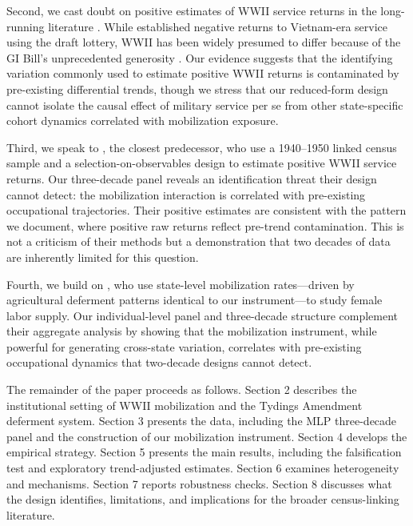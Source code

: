 \documentclass[12pt]{article}
\begin{document}
Second, we cast doubt on positive estimates of WWII service returns in the long-running literature \citep{angrist1990, angrist1998, angristkrueger1994, xie1992, costa2023}. While \citet{angrist1990} established negative returns to Vietnam-era service using the draft lottery, WWII has been widely presumed to differ because of the GI Bill's unprecedented generosity \citep{boundturner2002, turnerbound2003, mettler2005, fetter2013}. Our evidence suggests that the identifying variation commonly used to estimate positive WWII returns is contaminated by pre-existing differential trends, though we stress that our reduced-form design cannot isolate the causal effect of military service per se from other state-specific cohort dynamics correlated with mobilization exposure.

Third, we speak to \citet{collinszimran2025}, the closest predecessor, who use a 1940--1950 linked census sample and a selection-on-observables design to estimate positive WWII service returns. Our three-decade panel reveals an identification threat their design cannot detect: the mobilization interaction is correlated with pre-existing occupational trajectories. Their positive estimates are consistent with the pattern we document, where positive raw returns reflect pre-trend contamination. This is not a criticism of their methods but a demonstration that two decades of data are inherently limited for this question.

Fourth, we build on \citet{acemoglu2004}, who use state-level mobilization rates---driven by agricultural deferment patterns identical to our instrument---to study female labor supply. Our individual-level panel and three-decade structure complement their aggregate analysis by showing that the mobilization instrument, while powerful for generating cross-state variation, correlates with pre-existing occupational dynamics that two-decade designs cannot detect.

The remainder of the paper proceeds as follows. Section 2 describes the institutional setting of WWII mobilization and the Tydings Amendment deferment system. Section 3 presents the data, including the MLP three-decade panel and the construction of our mobilization instrument. Section 4 develops the empirical strategy. Section 5 presents the main results, including the falsification test and exploratory trend-adjusted estimates. Section 6 examines heterogeneity and mechanisms. Section 7 reports robustness checks. Section 8 discusses what the design identifies, limitations, and implications for the broader census-linking literature.
\end{document}
